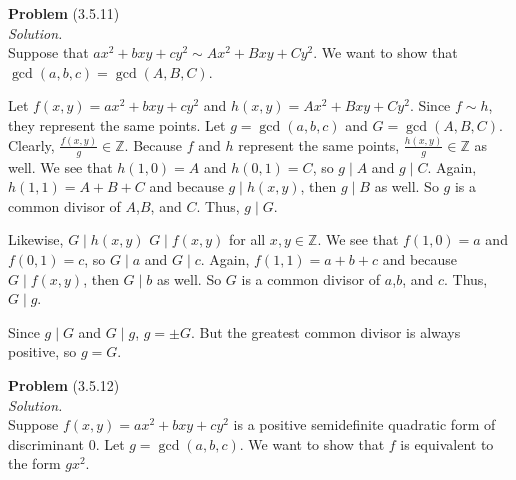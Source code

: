 \documentclass[12 pt]{amsart}
\begin{document}
\phantom{\quad} \vfill
\noindent
\textbf{Problem} (3.5.11) \\[4ex]
\emph{Solution.} \\[2ex]
  Suppose that $ax^2 + bxy + cy^2 \sim Ax^2 + Bxy + Cy^2$.
  We want to show that $\gcd(a,b,c) = \gcd(A,B,C)$.

  Let $f(x,y) = ax^2 + bxy + cy^2$ and 
  $h(x,y) = Ax^2 + Bxy + Cy^2$.
  Since $f \sim h$, they represent the same points.
  Let $g = \gcd(a,b,c)$ and $G = \gcd(A,B,C)$.
  Clearly, $\frac{f(x,y)}{g} \in \mathbb{Z}$.
  Because $f$ and $h$ represent the same points, 
  $\frac{h(x,y)}{g} \in \mathbb{Z}$ as well.
  We see that $h(1,0) = A$ and $h(0,1) = C$, 
  so $g \mid A$ and $g \mid C$. 
  Again, $h(1,1) = A + B + C$ and because
  $g \mid h(x,y)$, then $g \mid B$ as well.
  So $g$ is a common divisor of $A$,$B$, and $C$.
  Thus, $g \mid G$.

  Likewise, $G \mid h(x,y)$ 
  $G \mid f(x,y)$ for all $x,y \in \mathbb{Z}$.
  We see that 
  $f(1,0) = a$ 
  and 
  $f(0,1) = c$, 
  so 
  $G \mid a$ and $G \mid c$. 
  Again, $f(1,1) = a + b + c$ and because
  $G \mid f(x,y)$, then $G \mid b$ as well.
  So $G$ is a common divisor of $a$,$b$, and $c$.
  Thus, $G \mid g$.

  Since $g \mid G$ and $G \mid g$, 
  $g = \pm G$.
  But the greatest common divisor is always positive, 
  so $g = G$.
\vfill
\newpage



\phantom{\quad} \vfill
\noindent
\textbf{Problem} (3.5.12) \\[4ex]
\emph{Solution.} \\[2ex]
  Suppose $f(x,y) = ax^2 + bxy + cy^2$ is a positive
  semidefinite quadratic form of discriminant 0.
  Let $g = \gcd(a,b,c)$. 
  We want to show that $f$ is equivalent to the form $gx^2$.
\end{document}
